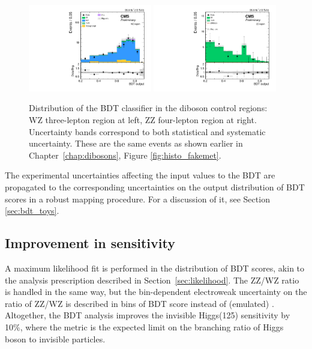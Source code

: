 \begin{figure}[htbp]
\begin{center}
\includegraphics[width=0.48\textwidth]{figures/fullsel_bdt_wz_postfit.pdf}
\includegraphics[width=0.48\textwidth]{figures/fullsel_bdt_zz_postfit.pdf}
\caption{Distribution of the BDT classifier in the diboson control regions: WZ three-lepton region at left, ZZ four-lepton region at right. Uncertainty bands correspond to both statistical and systematic uncertainty. These are the same events as shown earlier in Chapter~\ref{chap:dibosons}, Figure \ref{fig:histo_fakemet}.}
\label{fig:bdt_vv}
\end{center}
\end{figure}
\clearpage

The experimental uncertainties affecting the input values to the BDT are propagated to
the corresponding uncertainties on the output distribution of BDT scores in a robust mapping procedure.
For a discussion of it, see Section \ref{sec:bdt_toys}.

\subsection{Improvement in sensitivity} 
A maximum likelihood fit is performed in the distribution of BDT scores, akin to the \met analysis prescription described in Section~\ref{sec:likelihood}.
The ZZ/WZ ratio is handled in the same way, but the bin-dependent electroweak uncertainty on the ratio of ZZ/WZ
is described in bins of BDT score instead of (emulated) \met.
Altogether, the BDT analysis improves the invisible Higgs(125) sensitivity by 10\%,
where the metric is the expected limit on the branching ratio of Higgs boson to invisible particles.

